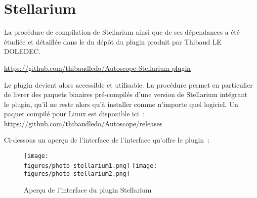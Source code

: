 \section{Stellarium}

La procédure de compilation de Stellarium ainsi que de ses dépendances a été étudiée et détaillée dans le  du dépôt du plugin produit par Thibaud LE DOLEDEC.

\url{https://github.com/thibaudledo/Autoscope-Stellarium-plugin}

\vspace{1cm}

Le plugin devient alors accessible et utilisable. La procédure permet en particulier de livrer des paquets binaires pré-compilés d'une version de Stellarium intégrant le plugin, qu'il ne reste alors qu'à installer comme n'importe quel logiciel. Un paquet compilé pour Linux est disponible ici~: \url{https://github.com/thibaudledo/Autoscope/releases}

\vspace{1cm}

Ci-dessous un aperçu de l'interface de l'interface qu'offre le plugin~:

\begin{figure}[H]
    \centering
	\texttt{[image: \\figures/photo\_stellarium1.png]}
	\texttt{[image: \\figures/photo\_stellarium2.png]}
    \decoRule
    \caption[
    Aperçu de l'interface du plugin Stellarium]{
    Aperçu de l'interface du plugin Stellarium}
    \label{fig:Aperçu de l'interface du plugin Stellarium}
    \end{figure}

